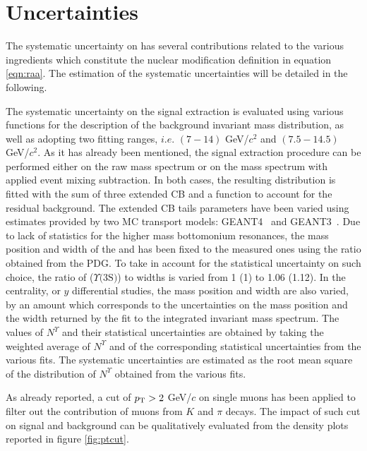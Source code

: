 \section{Uncertainties}\label{subsec:syst_uncert}

The systematic uncertainty on \raa has several contributions related to the various ingredients which constitute the nuclear modification definition in equation \ref{eqn:raa}.
The estimation of the systematic uncertainties will be detailed in the following.

The systematic uncertainty on the signal extraction is evaluated using various functions for the description of the background invariant mass distribution, as well as adopting two fitting ranges, $i.e.$ $(7-14)$ GeV/$c^2$ and $(7.5-14.5)$ GeV/$c^2$.
As it has already been mentioned, the signal extraction procedure can be performed either on the raw mass spectrum or on the mass spectrum with applied event mixing subtraction.
In both cases, the resulting distribution is fitted with the sum of three extended CB and a function to account for the residual background.
The extended CB tails parameters have been varied using estimates provided by two MC transport models: GEANT4~\cite{Agostinelli:2002hh} and GEANT3~\cite{Brun:1082634}. 
Due to lack of statistics for the higher mass bottomonium resonances, the mass position and width of the \upsiss and \upsisss has been fixed to the \upsis measured ones using the ratio obtained from the PDG.
To take in account for the statistical uncertainty on such choice, the ratio of \upsiss ($\Upsilon\text{(3S)}$) to \upsis widths is varied from 1 (1) to 1.06 (1.12).
In the centrality, \pt or $y$ differential studies, the mass position and width are also varied, by an amount which corresponds to the uncertainties on the mass position and the width returned by the fit to the integrated invariant mass spectrum. 
The values of $N^{\Upsilon}$ and their statistical uncertainties are obtained by taking the weighted average of $N^{\Upsilon}$ and of the corresponding statistical uncertainties from the various fits.
The systematic uncertainties are estimated as the root mean square of the distribution of $N^{\Upsilon}$ obtained from the various fits.

As already reported, a cut of $p_{\rm T} > 2$ GeV/$c$ on single muons has been applied to filter out the contribution of muons from $K$ and $\pi$ decays.
The impact of such cut on signal and background can be qualitatively evaluated from the density plots reported in figure \ref{fig:ptcut}.

